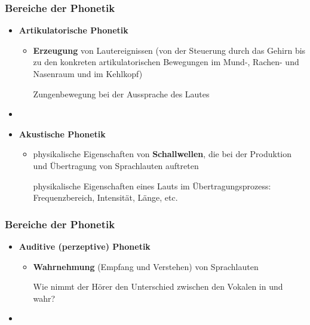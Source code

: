 
\begin{frame}
\frametitle{Bereiche der Phonetik}

	\begin{itemize}
		\item \textbf{Artikulatorische Phonetik}
		
		\begin{itemize}
			\item \textbf{Erzeugung} von Lautereignissen (von der Steuerung durch das Gehirn bis zu den konkreten artikulatorischen Bewegungen im Mund-, Rachen- und Nasenraum und im Kehlkopf)

			\ea Zungenbewegung bei der Aussprache des Lautes \textipa{[ \t{tS} ]}
			\z

		\end{itemize}
		
		\item[]
		\item \textbf{Akustische Phonetik}
		
		\begin{itemize}
			\item physikalische Eigenschaften von \textbf{Schallwellen}, die bei der Produktion und Übertragung von Sprachlauten auftreten

			\ea physikalische Eigenschaften eines Lauts im Übertragungsprozess: Frequenzbereich, Intensität, Länge, etc.
			\z
			
		\end{itemize}
		
	\end{itemize}
	
\end{frame}




\begin{frame}
\frametitle{Bereiche der Phonetik}

	\begin{itemize}
	
		\item \textbf{Auditive (perzeptive) Phonetik}
		
		\begin{itemize}
			\item \textbf{Wahrnehmung} (Empfang und Verstehen) von Sprachlauten

			\ea Wie nimmt der Hörer den Unterschied zwischen den Vokalen in  und  wahr?
			\z
			
		\end{itemize}
		
		\item[]
	\end{itemize}
	
\end{frame}



